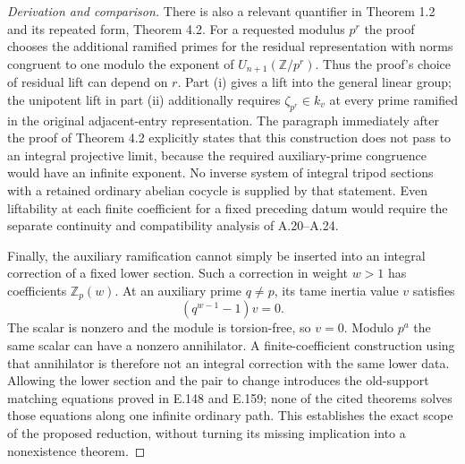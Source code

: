 \begin{proof}[Derivation and comparison]
There is also a relevant quantifier in Theorem 1.2 and its repeated
form, Theorem 4.2.  For a requested modulus $p^r$ the proof chooses
the additional ramified primes for the residual representation
with norms congruent to one modulo the exponent of
$U_{n+1}(\mathbb Z/p^r)$.  Thus the proof's choice of residual lift
can depend on $r$.  Part (i) gives a lift into the general linear
group; the unipotent lift in part (ii) additionally requires
$\zeta_{p^r}\in k_v$ at every prime ramified in the original
adjacent-entry representation.  The paragraph immediately after
the proof of Theorem 4.2 explicitly states that this construction
does not pass to an integral projective limit, because the required
auxiliary-prime congruence would have an infinite exponent.
No inverse system of integral tripod sections
with a retained ordinary abelian cocycle is supplied by that
statement.  Even liftability at each finite coefficient for a fixed
preceding datum would require the separate continuity and
compatibility analysis of A.20--A.24.

Finally, the auxiliary ramification cannot simply be inserted into
an integral correction of a fixed lower section.  Such a correction
in weight $w>1$ has coefficients $\mathbb Z_p(w)$.  At an auxiliary
prime $q\ne p$, its tame inertia value $v$ satisfies
\[
                     (q^{w-1}-1)v=0.
\]
The scalar is nonzero and the module is torsion-free, so $v=0$.
Modulo $p^a$ the same scalar can have a nonzero annihilator.  A
finite-coefficient construction using that annihilator is therefore
not an integral correction with the same lower data.  Allowing the
lower section and the pair to change introduces the old-support
matching equations proved in E.148 and E.159; none of the cited
theorems solves those equations along one infinite ordinary path.
This establishes the exact scope of the proposed reduction, without
turning its missing implication into a nonexistence theorem.
\end{proof}
